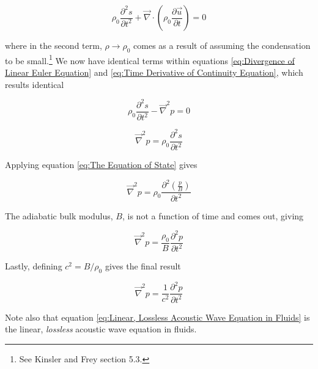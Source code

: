 \documentclass{book}
\begin{document}
\begin{equation} \label{eq:Time Derivative of Continuity Equation}
    \rho_0 \frac{\partial^2 s}{\partial t^2} + \vec{\nabla} \cdot \left(\rho_0 \frac{\partial \vec{u}}{\partial t}\right) = 0
\end{equation}

where in the second term, $\rho \rightarrow \rho_0$ comes as a result of assuming the condensation to be small.\footnote{See Kinsler and Frey section 5.3.} We now have identical terms within equations \ref{eq:Divergence of Linear Euler Equation} and \ref{eq:Time Derivative of Continuity Equation}, which results identical

\begin{equation}
    \rho_0 \frac{\partial^2 s}{\partial t^2} -\vec{\nabla}^2 p = 0
\end{equation}

\begin{equation}
    \vec{\nabla}^2 p = \rho_0 \frac{\partial^2 s}{\partial t^2}
\end{equation}

Applying equation \ref{eq:The Equation of State} gives

\begin{equation}
    \vec{\nabla}^2 p = \rho_0 \frac{\partial^2 \left(\frac{p}{B}\right)}{\partial t^2}
\end{equation}

The adiabatic bulk modulus, $B$, is not a function of time and comes out, giving

\begin{equation}
    \vec{\nabla}^2 p = \frac{\rho_0}{B} \frac{\partial^2 p}{\partial t^2}
\end{equation}

Lastly, defining $c^2 = B/\rho_0$ gives the final result

\begin{equation} \label{eq:Linear, Lossless Acoustic Wave Equation in Fluids}
    \boxed{\vec{\nabla}^2 p = \frac{1}{c^2} \frac{\partial^2 p}{\partial t^2}}
\end{equation}

Note also that equation \ref{eq:Linear, Lossless Acoustic Wave Equation in Fluids} is the linear, \textit{lossless} acoustic wave equation in fluids.
\end{document}
